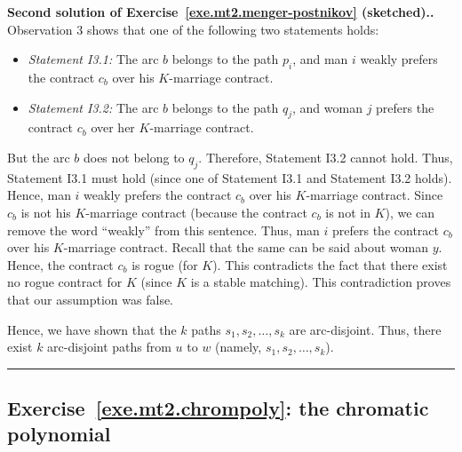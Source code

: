 \documentclass[numbers=enddot,12pt,final,onecolumn,notitlepage]{scrartcl}%
\theoremstyle{definition}
\newenvironment{proof}[1][Proof]{\noindent\textbf{#1.} }{\ \rule{0.5em}{0.5em}}
\begin{document}
\begin{proof}[Second solution of
Exercise~\ref{exe.mt2.menger-postnikov} (sketched).]
Observation 3 shows that one of the following two statements holds:

\begin{itemize}
\item \textit{Statement I3.1:}
   The arc $b$ belongs to the path $p_i$, and
   man $i$ weakly prefers
   the contract $c_b$ over his $K$-marriage contract.

\item \textit{Statement I3.2:}
   The arc $b$ belongs to the path $q_j$, and
   woman $j$ prefers
   the contract $c_b$ over her $K$-marriage contract.
\end{itemize}

But the arc $b$ does not belong to $q_j$.
Therefore, Statement I3.2 cannot hold.
Thus, Statement I3.1 must hold (since one of Statement I3.1 and
Statement I3.2 holds).
Hence, man $i$ weakly prefers
the contract $c_b$ over his $K$-marriage contract.
Since $c_b$ is not his $K$-marriage contract (because the contract
$c_b$ is not in $K$), we can remove the word ``weakly'' from this
sentence.
Thus, man $i$ prefers the contract $c_b$ over his $K$-marriage
contract.
Recall that the same can be said about woman $y$.
Hence, the contract $c_b$ is rogue (for $K$).
This contradicts the fact that there exist no rogue contract for
$K$ (since $K$ is a stable matching).
This contradiction proves that our assumption was false.

Hence, we have shown that the $k$ paths
$s_1, s_2, \ldots, s_k$ are arc-disjoint.
Thus, there exist $k$ arc-disjoint paths from $u$ to $w$
(namely, $s_1, s_2, \ldots, s_k$).
\end{proof}

\subsection{Exercise~\ref{exe.mt2.chrompoly}:
the chromatic polynomial}
\end{document}
